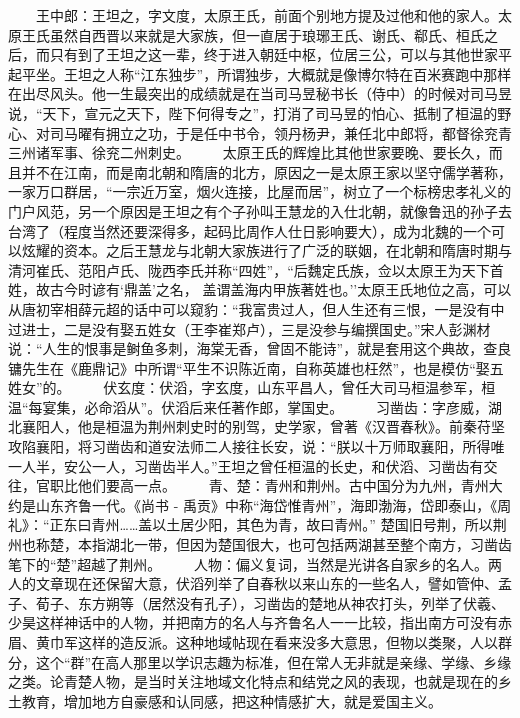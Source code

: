 \documentclass[]{book}
\begin{document}
　　王中郎：王坦之，字文度，太原王氏，前面个别地方提及过他和他的家人。太原王氏虽然自西晋以来就是大家族，但一直居于琅琊王氏、谢氏、郗氏、桓氏之后，而只有到了王坦之这一辈，终于进入朝廷中枢，位居三公，可以与其他世家平起平坐。王坦之人称``江东独步''，所谓独步，大概就是像博尔特在百米赛跑中那样在出尽风头。他一生最突出的成绩就是在当司马昱秘书长（侍中）的时候对司马昱说，``天下，宣元之天下，陛下何得专之''，打消了司马昱的怕心、抵制了桓温的野心、对司马曜有拥立之功，于是任中书令，领丹杨尹，兼任北中郎将，都督徐兖青三州诸军事、徐兖二州刺史。
　　太原王氏的辉煌比其他世家要晚、要长久，而且并不在江南，而是南北朝和隋唐的北方，原因之一是太原王家以坚守儒学著称，一家万口群居，``一宗近万室，烟火连接，比屋而居''，树立了一个标榜忠孝礼义的门户风范，另一个原因是王坦之有个子孙叫王慧龙的入仕北朝，就像鲁迅的孙子去台湾了（程度当然还要深得多，起码比周作人仕日影响要大），成为北魏的一个可以炫耀的资本。之后王慧龙与北朝大家族进行了广泛的联姻，在北朝和隋唐时期与清河崔氏、范阳卢氏、陇西李氏并称``四姓''，``后魏定氏族，佥以太原王为天下首姓，故古今时谚有`鼎盖'之名，
盖谓盖海内甲族著姓也。''太原王氏地位之高，可以从唐初宰相薛元超的话中可以窥豹：``我富贵过人，但人生还有三恨，一是没有中过进士，二是没有娶五姓女（王李崔郑卢），三是没参与编撰国史。''宋人彭渊材说：``人生的恨事是鲥鱼多刺，海棠无香，曾固不能诗''，就是套用这个典故，查良镛先生在《鹿鼎记》中所谓``平生不识陈近南，自称英雄也枉然''，也是模仿``娶五姓女''的。
　　伏玄度：伏滔，字玄度，山东平昌人，曾任大司马桓温参军，桓温``每宴集，必命滔从''。伏滔后来任著作郎，掌国史。
　　习凿齿：字彦威，湖北襄阳人，他是桓温为荆州刺史时的别驾，史学家，曾著《汉晋春秋》。前秦苻坚攻陷襄阳，将习凿齿和道安法师二人接往长安，说：``朕以十万师取襄阳，所得唯一人半，安公一人，习凿齿半人。''王坦之曾任桓温的长史，和伏滔、习凿齿有交往，官职比他们要高一点。
　　青、楚：青州和荆州。古中国分为九州，青州大约是山东齐鲁一代。《尚书 -
禹贡》中称``海岱惟青州''，海即渤海，岱即泰山，《周礼》：``正东曰青州\ldots{}\ldots{}盖以土居少阳，其色为青，故曰青州。''
楚国旧号荆，所以荆州也称楚，本指湖北一带，但因为楚国很大，也可包括两湖甚至整个南方，习凿齿笔下的``楚''超越了荆州。
　　人物：偏义复词，当然是光讲各自家乡的名人。两人的文章现在还保留大意，伏滔列举了自春秋以来山东的一些名人，譬如管仲、孟子、荀子、东方朔等（居然没有孔子），习凿齿的楚地从神农打头，列举了伏羲、少昊这样神话中的人物，并把南方的名人与齐鲁名人一一比较，指出南方可没有赤眉、黄巾军这样的造反派。这种地域帖现在看来没多大意思，但物以类聚，人以群分，这个``群''在高人那里以学识志趣为标准，但在常人无非就是亲缘、学缘、乡缘之类。论青楚人物，是当时关注地域文化特点和结党之风的表现，也就是现在的乡土教育，增加地方自豪感和认同感，把这种情感扩大，就是爱国主义。
\end{document}
